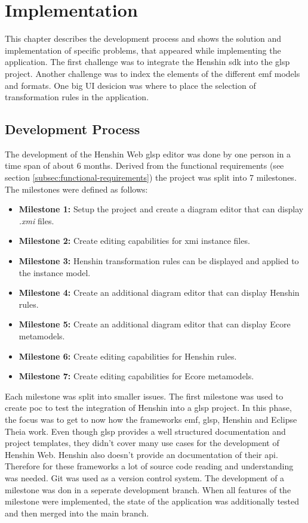 \section{Implementation}
  \label{subsec:implementation}
  This chapter describes the development process and shows the solution and implementation of specific problems, that appeared while implementing the application. The first challenge was to integrate the Henshin \acs{sdk} into the \ac{glsp} project. Another challenge was to index the elements of the different \ac{emf} models and formats. One big UI desicion was where to place the selection of transformation rules in the application.

  \subsection{Development Process}
  \label{subsec:development-process}
  The development of the Henshin Web \ac{glsp} editor was done by one person in a time span of about 6 months. Derived from the functional requirements (see section \ref{subsec:functional-requirements}) the project was split into 7 milestones. The milestones were defined as follows:
  \begin{itemize}
    \item \textbf{Milestone 1:} Setup the project and create a diagram editor that can display \textit{.xmi} files.
    \item \textbf{Milestone 2:} Create editing capabilities for \ac{xmi} instance files.
    \item \textbf{Milestone 3:} Henshin transformation rules can be displayed and applied to the instance model.
    \item \textbf{Milestone 4:} Create an additional diagram editor that can display Henshin rules.
    \item \textbf{Milestone 5:} Create an additional diagram editor that can display Ecore metamodels.
    \item \textbf{Milestone 6:} Create editing capabilities for Henshin rules.
    \item \textbf{Milestone 7:} Create editing capabilities for Ecore metamodels.
  \end{itemize}

  Each milestone was split into smaller issues. The first milestone was used to create \ac{poc} to test the integration of Henshin into a \ac{glsp} project. In this phase, the focus was to get to now how the frameworks \ac{emf}, \ac{glsp}, Henshin and Eclipse Theia work. Even though \ac{glsp} provides a well structured documentation and project templates, they didn't cover many use cases for the development of Henshin Web. Henshin also doesn't provide an documentation of their \acs{api}. Therefore for these frameworks a lot of source code reading and understanding was needed. 
  Git was used as a version control system. The development of a milestone was don in a seperate development branch. When all features of the milestone were implemented, the state of the application was additionally tested and then merged into the main branch.

